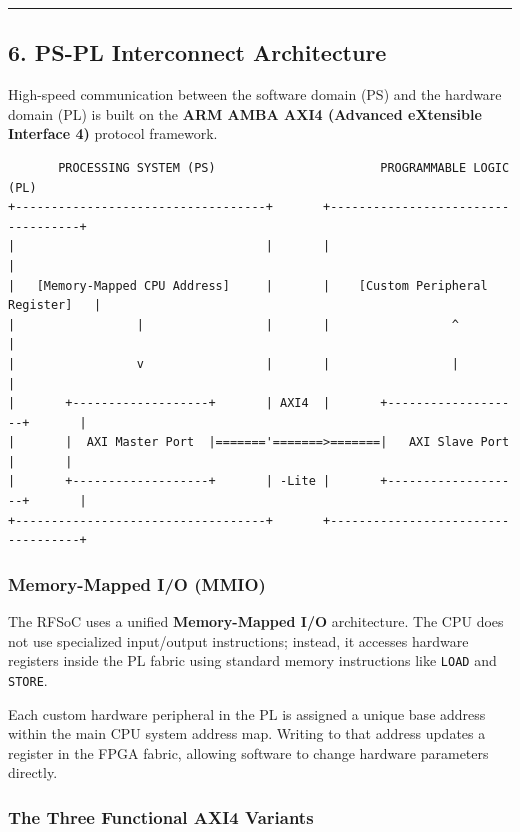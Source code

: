 \documentclass[
]{article}
\begin{document}
\begin{center}\rule{0.5\linewidth}{0.5pt}\end{center}

\subsection{6. PS-PL Interconnect
Architecture}\label{ps-pl-interconnect-architecture}

High-speed communication between the software domain (PS) and the
hardware domain (PL) is built on the \textbf{ARM AMBA AXI4 (Advanced
eXtensible Interface 4)} protocol framework.

\begin{verbatim}
       PROCESSING SYSTEM (PS)                       PROGRAMMABLE LOGIC (PL)
+-----------------------------------+       +-----------------------------------+
|                                   |       |                                   |
|   [Memory-Mapped CPU Address]     |       |    [Custom Peripheral Register]   |
|                 |                 |       |                 ^                 |
|                 v                 |       |                 |                 |
|       +-------------------+       | AXI4  |       +-------------------+       |
|       |  AXI Master Port  |======='=======>=======|   AXI Slave Port  |       |
|       +-------------------+       | -Lite |       +-------------------+       |
+-----------------------------------+       +-----------------------------------+
\end{verbatim}

\subsubsection{Memory-Mapped I/O (MMIO)}\label{memory-mapped-io-mmio}

The RFSoC uses a unified \textbf{Memory-Mapped I/O} architecture. The
CPU does not use specialized input/output instructions; instead, it
accesses hardware registers inside the PL fabric using standard memory
instructions like \texttt{LOAD} and \texttt{STORE}.

Each custom hardware peripheral in the PL is assigned a unique base
address within the main CPU system address map. Writing to that address
updates a register in the FPGA fabric, allowing software to change
hardware parameters directly.

\subsubsection{The Three Functional AXI4
Variants}\label{the-three-functional-axi4-variants}
\end{document}
